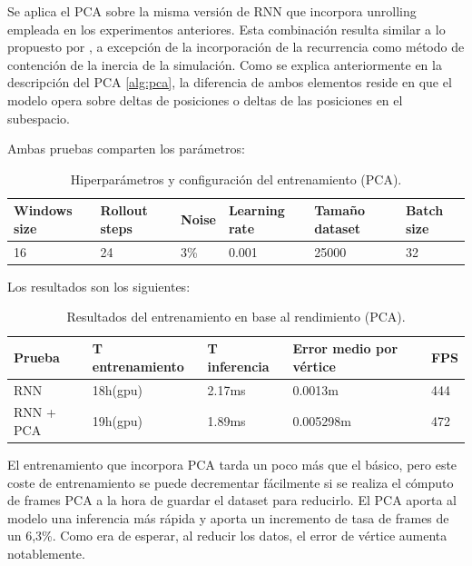 Se aplica el PCA sobre la misma versión de RNN que incorpora unrolling empleada en los experimentos anteriores. Esta combinación resulta similar a lo propuesto por \cite{holden_subspace_2019}, a excepción de la incorporación de la recurrencia como método de contención de la inercia de la simulación. Como se explica anteriormente en la descripción del PCA \ref{alg:pca}, la diferencia de ambos elementos reside en que el modelo opera sobre deltas de posiciones o deltas de las posiciones en el subespacio.

Ambas pruebas comparten los parámetros:
\begin{table}[H]
    \begin{center}
        \begin{tabular}{ | m{2.2cm} | m{2cm} | m{1.2cm} | m{2.1cm} | m{2.4cm} | m{2.2cm} | }
        \hline \textbf{Windows size} & \textbf{Rollout steps} & \textbf{Noise} & \textbf{Learning rate} & \textbf{Tamaño dataset} & \textbf{Batch size} \\ \hline
            16 & 24 & 3\% & 0.001 & 25000 & 32 \\ \hline
        \end{tabular}
            \end{center}
    \caption{Hiperparámetros y configuración del entrenamiento (PCA).}
    \label{tab:randomTrainingPCA}
\end{table}

Los resultados son los siguientes:
\begin{table}[H]
    \begin{center}
        \begin{tabular}{ | m{2.2cm} |  m{2.8cm} | m{2.8cm} | m{2.6cm} | m{1.2cm} |}
        \hline \textbf{Prueba} & \textbf{T entrenamiento} & \textbf{T inferencia} & \textbf{Error medio por vértice} & \textbf{FPS} \\ \hline
            RNN & 18h(gpu) & 2.17ms & 0.0013m & 444 \\ \hline
            RNN + PCA & 19h(gpu) & 1.89ms & 0.005298m & 472 \\ \hline
        \end{tabular}
    \end{center}
    \caption{Resultados del entrenamiento en base al rendimiento (PCA).}
    \label{tab:rendResultsPCA}
\end{table}

El entrenamiento que incorpora PCA tarda un poco más que el básico, pero este coste de entrenamiento se puede decrementar fácilmente si se realiza el cómputo de frames PCA a la hora de guardar el dataset para reducirlo. El PCA aporta al modelo una inferencia más rápida y aporta un incremento de tasa de frames de un 6,3\%. Como era de esperar, al reducir los datos, el error de vértice aumenta notablemente.

